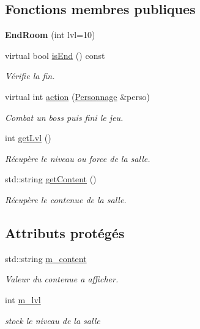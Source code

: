 \subsection*{Fonctions membres publiques}
\begin{DoxyCompactItemize}
\item 
\hypertarget{class_end_room_aab637ba35afa1f07cf888cd48714809f}{{\bfseries End\-Room} (int lvl=10)}\label{class_end_room_aab637ba35afa1f07cf888cd48714809f}

\item 
virtual bool \hyperlink{class_end_room_a357ab3e12cd3af4e373a8d7c8c4681f4}{is\-End} () const 
\begin{DoxyCompactList}\small\item\em Vérifie la fin. \end{DoxyCompactList}\item 
virtual int \hyperlink{class_end_room_ad7691b55dcf3ed863c8a774138105900}{action} (\hyperlink{class_personnage}{Personnage} \&perso)
\begin{DoxyCompactList}\small\item\em Combat un boss puis fini le jeu. \end{DoxyCompactList}\item 
int \hyperlink{class_room_comportement_a645473f228c0e73532a309ad512456eb}{get\-Lvl} ()
\begin{DoxyCompactList}\small\item\em Récupère le niveau ou force de la salle. \end{DoxyCompactList}\item 
std\-::string \hyperlink{class_room_comportement_a6927d638d17858a303d77b449c7552b4}{get\-Content} ()
\begin{DoxyCompactList}\small\item\em Récupère le contenue de la salle. \end{DoxyCompactList}\end{DoxyCompactItemize}
\subsection*{Attributs protégés}
\begin{DoxyCompactItemize}
\item 
\hypertarget{class_room_comportement_a48186371372d14465faffc7734e89fdc}{std\-::string \hyperlink{class_room_comportement_a48186371372d14465faffc7734e89fdc}{m\-\_\-content}}\label{class_room_comportement_a48186371372d14465faffc7734e89fdc}

\begin{DoxyCompactList}\small\item\em Valeur du contenue a afficher. \end{DoxyCompactList}\item 
\hypertarget{class_room_comportement_acfc0d0c3c7dbcd88235e8c615f7290a3}{int \hyperlink{class_room_comportement_acfc0d0c3c7dbcd88235e8c615f7290a3}{m\-\_\-lvl}}\label{class_room_comportement_acfc0d0c3c7dbcd88235e8c615f7290a3}

\begin{DoxyCompactList}\small\item\em stock le niveau de la salle \end{DoxyCompactList}\end{DoxyCompactItemize}
